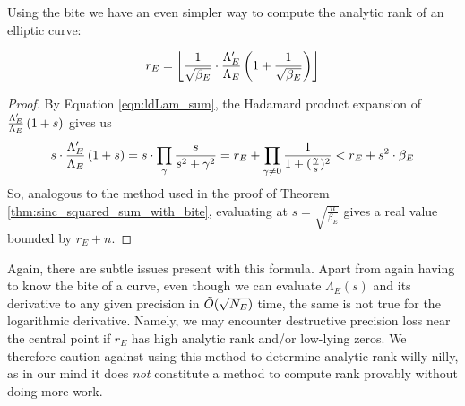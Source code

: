 Using the bite we have an even simpler way to compute the analytic rank of an elliptic curve:
\begin{theorem}[GRH]\label{thm:compute_rank_by_logderiv}
\begin{equation}
r_E = \left\lfloor\frac{1}{\sqrt{\beta_E}}\cdot \frac{\Lambda_E^{\prime}}{\Lambda_E}\left(1+\frac{1}{\sqrt{\beta_E}}\right)\right\rfloor
\end{equation}
\end{theorem}
\begin{proof}
By Equation \ref{eqn:ldLam_sum}, the Hadamard product expansion of $\frac{\Lambda_E^{\prime}}{\Lambda_E}\left(1+s\right)$ gives us \begin{equation}
s\cdot \frac{\Lambda_E^{\prime}}{\Lambda_E}\left(1+s\right) = s\cdot \prod_{\gamma} \frac{s}{s^2+\gamma^2} = r_E + \prod_{\gamma\ne 0} \frac{1}{1+(\frac{\gamma}{s})^2} < r_E + s^2\cdot \beta_E
\end{equation}
So, analogous to the method used in the proof of Theorem \ref{thm:sinc_squared_sum_with_bite}, evaluating at $s = \sqrt{\frac{n}{\beta_E}}$ gives a real value bounded by $r_E+n$.
\end{proof}

Again, there are subtle issues present with this formula. Apart from again having to know the bite of a curve, even though we can evaluate $\Lambda_E(s)$ and its derivative to any given precision in $\tilde{O}(\sqrt{N_E})$ time, the same is not true for the logarithmic derivative. Namely, we may encounter destructive precision loss near the central point if $r_E$ has high analytic rank and/or low-lying zeros. We therefore caution against using this method to determine analytic rank willy-nilly, as in our mind it does {\it not} constitute a method to compute rank provably without doing more work.
